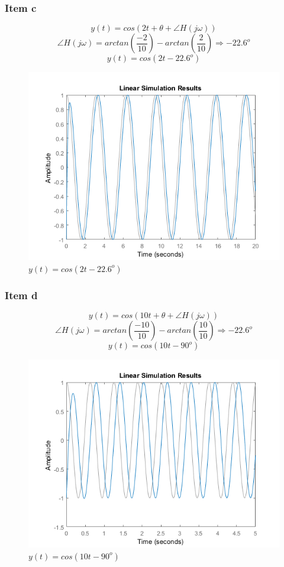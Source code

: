 \documentclass[a4paper, 12pt]{article}
\begin{document}
        \subsubsection{Item c}
        \[y(t) = cos(2t + \theta + \angle H(j\omega))\]
        \[\angle H(j\omega) = arctan \left(\frac{-2}{10}\right) - arctan \left(\frac{2}{10}\right) \Rightarrow -22.6^{o} \]
        \[y(t) = cos(2t -22.6^{o})\]   
		\begin{figure}[!ht]
			\centering
			\includegraphics{img/Q5b.png}
			\caption{$y(t) = cos(2t -22.6^{o})$}	
		\end{figure}	   
		\newpage                       
        \subsubsection{Item d}
        \[y(t) = cos(10t + \theta + \angle H(j\omega))\]
        \[\angle H(j\omega) = arctan \left(\frac{-10}{10}\right) - arctan \left(\frac{10}{10}\right) \Rightarrow -22.6^{o} \]
        \[y(t) = cos(10t -90^{o})\]  
		\begin{figure}[!ht]
			\centering
			\includegraphics{img/Q5c.png}
			\caption{$y(t) = cos(10t -90^{o})$}	
		\end{figure}	       
		\newpage             
\end{document}
